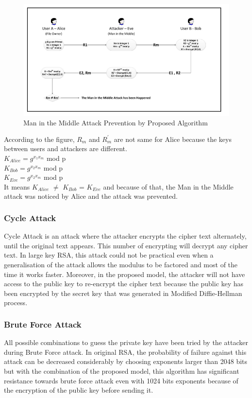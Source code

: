 \vspace{-10pt}
\begin{figure}[H]
	\centering
	\includegraphics[width=160mm]{images/maninmiddle.png}{}
	\caption{ Man in the Middle Attack Prevention by Proposed Algorithm} %
	\label{figmaninmiddle} %
\end{figure}

According to the figure, $R_{m}$ and $R^{'}_{m}$ are not same for
Alice because the keys between users and attackers are
different.\\
{$K_{Alice} = g^{x_{1}{x_{m}}}$ mod p}\\
{$K_{Bob} = g^{x_{2}{x_{m}}}$ mod p}\\
{$K_{Eve} = g^{x_{2}{x_{m}}}$ mod p}\\
It means $K_{Alice}$ $\neq$ $K_{Bob}$ = $K_{Eve}$  and because of that, the
Man in the Middle attack was noticed by Alice and the attack
was prevented.

\subsubsection{Cycle Attack }
Cycle Attack is an attack where the attacker encrypts the
cipher text alternately, until the original text appears. This
number of encrypting will decrypt any cipher text. In large key
RSA, this attack could not be practical even when a
generalisation of the attack allows the modulus to be factored
and most of the time it works faster. Moreover, in the
proposed model, the attacker will not have access to the public
key to re-encrypt the cipher text because the public key has
been encrypted by the secret key that was generated in
Modified Diffie-Hellman process.

\subsubsection{Brute Force Attack}
All possible combinations to guess the private key have
been tried by the attacker during Brute Force attack. In
original RSA, the probability of failure against this attack can
be decreased considerably by choosing exponents larger than
2048 bits but with the combination of the proposed model, this
algorithm has significant resistance towards brute force attack
even with 1024 bits exponents because of the encryption of
the public key before sending it.

